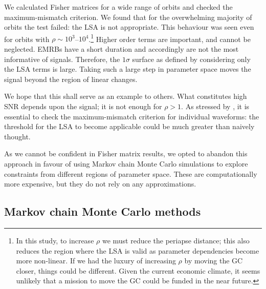 \documentclass[useAMS,usedcolumn,usegraphicx,usenatbib]{mn2e}
\begin{document}
We calculated Fisher matrices for a wide range of orbits and checked the maximum-mismatch criterion. We found that for the overwhelming majority of orbits the test failed: the LSA is not appropriate. This behaviour was seen even for orbits with $\rho \sim 10^3$--$10^4$.\footnote{In this study, to increase $\rho$ we must reduce the periapse distance; this also reduces the region where the LSA is valid as parameter dependencies become more non-linear. If we had the luxury of increasing $\rho$ by moving the GC closer, things could be different. Given the current economic climate, it seems unlikely that a mission to move the GC could be funded in the near future.} Higher order terms are important, and cannot be neglected. EMRBs have a short duration and accordingly are not the most informative of signals. Therefore, the $1\sigma$ surface as defined by considering only the LSA terms is large. Taking such a large step in parameter space moves the signal beyond the region of linear changes.

We hope that this shall serve as an example to others. What constitutes high SNR depends upon the signal; it is not enough for $\rho > 1$. As stressed by \citet{Vallisneri2008}, it is essential to check the maximum-mismatch criterion for individual waveforms: the threshold for the LSA to become applicable could be much greater than naively thought.

As we cannot be confident in Fisher matrix results, we opted to abandon this approach in favour of using Markov chain Monte Carlo simulations to explore constraints from different regions of parameter space. These are computationally more expensive, but they do not rely on any approximations.

\subsection{Markov chain Monte Carlo methods}
\end{document}
